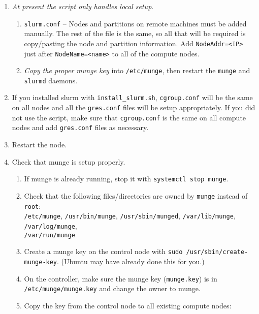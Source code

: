 \begin{enumerate}
\item \emph{At present the script only handles local setup}. 

	\begin{enumerate}
	\item \texttt{slurm.conf} -- Nodes and partitions on remote machines must be added manually. The rest of the file is the same, so all that will be required is copy/pasting the node and partition information. Add \texttt{NodeAddr=<IP>} just after \texttt{NodeName=<name>} to all of the compute nodes.

	\item \emph{Copy the proper munge key} into \texttt{/etc/munge}, then restart the \texttt{munge} and \texttt{slurmd} daemons.
	\end{enumerate}

\item If you installed slurm with \texttt{install\_slurm.sh}, \texttt{cgroup.conf} will be the same on all nodes and all the \texttt{gres.conf} files will be setup appropriately. If you did not use the script, make sure that \texttt{cgroup.conf} is the same on all compute nodes and add \texttt{gres.conf} files as necessary.

\item Restart the node.

\item Check that munge is setup properly. \label{list:munge}
	\begin{enumerate}
	\item If munge is already running, stop it with \texttt{systemctl stop munge}.

	\item Check that the following files/directories are owned by \texttt{munge} instead of \texttt{root}: \\
	\texttt{/etc/munge}, 
	\texttt{/usr/bin/munge}, 
	\texttt{/usr/sbin/munged}, 
	\texttt{/var/lib/munge}, 
	\texttt{/var/log/munge}, \\
	\texttt{/var/run/munge}

	\item Create a munge key on the control node with \texttt{sudo /usr/sbin/create-munge-key}. (Ubuntu may have already done this for you.) 

	\item On the controller, make sure the munge key (\texttt{munge.key}) is in \texttt{/etc/munge/munge.key} and change the owner to munge.  

	\item Copy the key from the control node to all existing compute nodes: 


\end{enumerate}
\end{enumerate}
